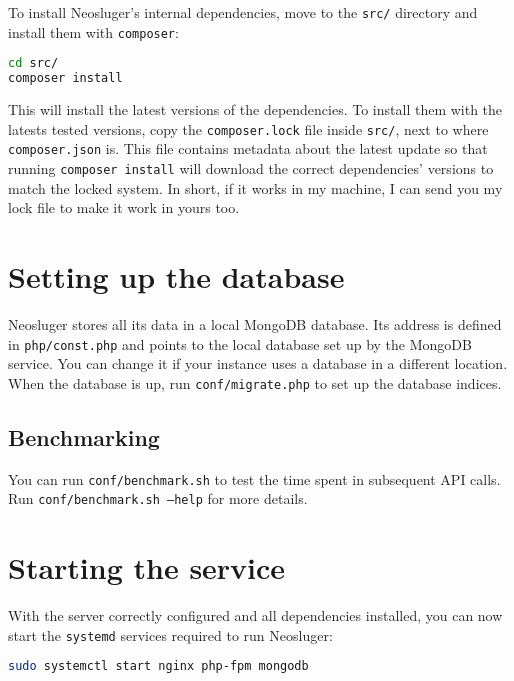 To install Neosluger's internal dependencies, move to the \texttt{src/} directory and install them with \texttt{composer}:

\begin{lstlisting}[language=sh]
cd src/
composer install
\end{lstlisting}

This will install the latest versions of the dependencies.
To install them with the latests tested versions, copy the \texttt{composer.lock} file inside \texttt{src/}, next to where \texttt{composer.json} is.
This file contains metadata about the latest update so that running \texttt{composer install} will download the correct dependencies' versions to match the locked system.
In short, if it works in my machine, I can send you my lock file to make it work in yours too.

\section{Setting up the database}\label{setting-up-the-database}

Neosluger stores all its data in a local MongoDB database.
Its address is defined in \texttt{php/const.php} and points to the local database set up by the MongoDB service.
You can change it if your instance uses a database in a different location.
When the database is up, run \texttt{conf/migrate.php} to set up the database indices.

\subsection{Benchmarking}\label{benchmarking}

You can run \texttt{conf/benchmark.sh} to test the time spent in subsequent API calls.
Run \texttt{conf/benchmark.sh --help} for more details.

\section{Starting the service}\label{starting-the-service}

With the server correctly configured and all dependencies installed, you can now start the \texttt{systemd} services required to run Neosluger:

\begin{lstlisting}[language=sh]
sudo systemctl start nginx php-fpm mongodb
\end{lstlisting}

